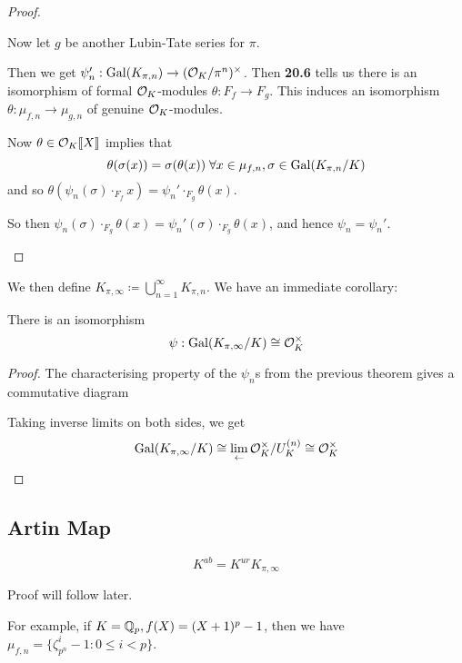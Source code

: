 \documentclass[10pt,a4paper]{article}
\begin{document}
\begin{proof}
\begin{enumerate}
    Now let $g$ be another Lubin-Tate series for $\pi$.

    Then we get $\psi_n' : \operatorname{Gal}(K_{\pi,n}) \to (\mathcal{O}_K/\pi^n)^\times$. Then \textbf{20.6} tells us there is an isomorphism of formal $\mathcal{O}_K$-modules $\theta:F_f \to F_g$. This induces an isomorphism $\theta: \mu_{f,n}\to \mu_{g,n}$ of genuine $\mathcal{O}_K$-modules.

    Now $\theta \in \mathcal{O}_K \llbracket X \rrbracket$ implies that
    \[\theta(\sigma(x)) = \sigma(\theta(x)) \forall x \in \mu_{f,n}, \sigma \in \Gal(K_{\pi,n}/K)\]
    and so $\theta(\psi_n(\sigma)\cdot_{F_f} x) = \psi_n' \cdot_{F_g} \theta(x)$.

    So then $\psi_n(\sigma)\cdot_{F_g}\theta(x) = \psi_n'(\sigma)\cdot_{F_g}\theta(x)$, and hence $\psi_n = \psi_n'$.
  \end{enumerate}
\end{proof}
We then define $K_{\pi, \infty} \coloneqq \bigcup_{n=1}^\infty K_{\pi,n}$. We have an immediate corollary:
\begin{corollary}
  There is an isomorphism
  \[\psi:\operatorname{Gal}(K_{\pi,\infty}/K) \cong \mathcal{O}_K^\times\]
\end{corollary}
\begin{proof}
  The characterising property of the $\psi_n$s from the previous theorem gives a commutative diagram
  \begin{center}
  \end{center}
  Taking inverse limits on both sides, we get
  \[\operatorname{Gal}(K_{\pi, \infty}/K) \cong \lim_{\leftarrow}\mathcal{O}_K^\times/U_K^{(n)} \cong \mathcal{O}_K^\times\]
\end{proof}
\subsection{Artin Map}
\begin{theorem}
  \[K^{ab} = K^{ur}K_{\pi, \infty}\]
\end{theorem}
Proof will follow later.

For example, if $K=\mathbb{Q}_p, f(X) = (X+1)^p-1$, then we have $\mu_{f,n} = \{\zeta_{p^n}^i - 1 : 0\leq i<p\}$.
\end{document}
